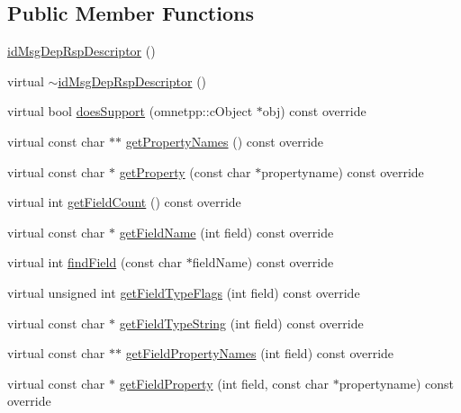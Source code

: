\subsection*{Public Member Functions}
\begin{DoxyCompactItemize}
\item 
\hyperlink{classid_msg_dep_rsp_descriptor_abedc396206c401b49a270bdc1bce5005}{id\+Msg\+Dep\+Rsp\+Descriptor} ()
\item 
virtual \hyperlink{classid_msg_dep_rsp_descriptor_acd48feffd371854f0d17b7201b672adf}{$\sim$id\+Msg\+Dep\+Rsp\+Descriptor} ()
\item 
virtual bool \hyperlink{classid_msg_dep_rsp_descriptor_a5e341b089472aeeb8a4854a7f4680794}{does\+Support} (omnetpp\+::c\+Object $\ast$obj) const override
\item 
virtual const char $\ast$$\ast$ \hyperlink{classid_msg_dep_rsp_descriptor_ac0d3a1bc5b63ebd0b88971dd6e2e2916}{get\+Property\+Names} () const override
\item 
virtual const char $\ast$ \hyperlink{classid_msg_dep_rsp_descriptor_a241bcfafb380d863d82e281b53c569d5}{get\+Property} (const char $\ast$propertyname) const override
\item 
virtual int \hyperlink{classid_msg_dep_rsp_descriptor_acac56df86dc592e4f75bfe669fbe7f4f}{get\+Field\+Count} () const override
\item 
virtual const char $\ast$ \hyperlink{classid_msg_dep_rsp_descriptor_adf1d3fbc7cac0f37939843ba3ebfcbe7}{get\+Field\+Name} (int field) const override
\item 
virtual int \hyperlink{classid_msg_dep_rsp_descriptor_a74b6bf9b08e70b9b91ee3e6765502af3}{find\+Field} (const char $\ast$field\+Name) const override
\item 
virtual unsigned int \hyperlink{classid_msg_dep_rsp_descriptor_a59b8fc18b2af7d74d95780a40e26b199}{get\+Field\+Type\+Flags} (int field) const override
\item 
virtual const char $\ast$ \hyperlink{classid_msg_dep_rsp_descriptor_ad3182b84a62c4607fe30506c392fa8af}{get\+Field\+Type\+String} (int field) const override
\item 
virtual const char $\ast$$\ast$ \hyperlink{classid_msg_dep_rsp_descriptor_a6a44113613dc717a215e94182ca73cb3}{get\+Field\+Property\+Names} (int field) const override
\item 
virtual const char $\ast$ \hyperlink{classid_msg_dep_rsp_descriptor_a522e2185bfa9e8833c180e4753c2f812}{get\+Field\+Property} (int field, const char $\ast$propertyname) const override

\end{DoxyCompactItemize}

